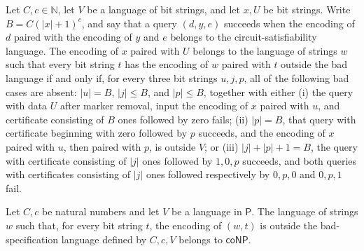 \begin{theorem}
\label{Complexity.KarpLipton.mem_innerLang_pair}
\leanok
{}
Let $C,c\in\mathbb{N}$, let $V$ be a language of bit strings, and let $x,U$ be
bit strings. Write $B=C(|x|+1)^c$, and say that a query $(d,y,e)$ succeeds when the encoding
of $d$ paired with the encoding of $y$ and $e$ belongs to the circuit-satisfiability
language. The encoding of $x$ paired with $U$ belongs to the language of strings $w$
such that every bit string $t$ has the encoding of $w$ paired with $t$ outside the bad
language if and only if, for every three bit strings $u,j,p$, all of the following bad
cases are absent: $|u|=B$, $|j|\le B$, and $|p|\le B$, together with either (i) the
query with data $U$ after marker removal, input the encoding of $x$ paired with $u$, and
certificate consisting of $B$ ones followed by zero fails; (ii) $|p|=B$, that query with
certificate beginning with zero followed by $p$ succeeds, and the encoding of $x$ paired
with $u$, then paired with $p$, is outside $V$; or (iii) $|j|+|p|+1=B$, the query with
certificate consisting of $|j|$ ones followed by $1,0,p$ succeeds, and both queries with
certificates consisting of $|j|$ ones followed respectively by $0,p,0$ and $0,p,1$ fail.
\end{theorem}

\begin{theorem}
\label{Complexity.KarpLipton.innerLang_mem_coNP}
\leanok
{}
Let $C,c$ be natural numbers and let $V$ be a language in $\mathsf{P}$. The language of
strings $w$ such that, for every bit string $t$, the encoding of $(w,t)$ is outside the
bad-specification language defined by $C,c,V$ belongs to $\mathsf{coNP}$.
\end{theorem}

